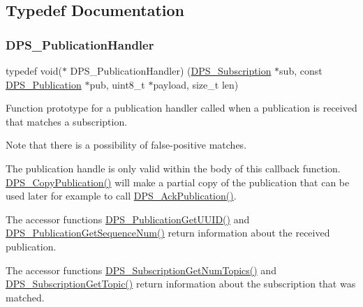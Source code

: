 \subsection{Typedef Documentation}
\mbox{\label{group__subscription_gab95ef1762636ad505c940744b8dce83f}} 
\subsubsection{\texorpdfstring{D\+P\+S\+\_\+\+Publication\+Handler}{DPS\_PublicationHandler}}
{\footnotesize\ttfamily typedef void($\ast$ D\+P\+S\+\_\+\+Publication\+Handler) (\hyperlink{group__subscription_gadb927c4c1b7306867a75fc4288b54af7}{D\+P\+S\+\_\+\+Subscription} $\ast$sub, const \hyperlink{group__publication_ga0d439693474aa54e27f3d45a054696ac}{D\+P\+S\+\_\+\+Publication} $\ast$pub, uint8\+\_\+t $\ast$payload, size\+\_\+t len)}



Function prototype for a publication handler called when a publication is received that matches a subscription. 

Note that there is a possibility of false-\/positive matches.

The publication handle is only valid within the body of this callback function. \hyperlink{group__publication_ga41f31a8b63558e13d73d96de6086e5c4}{D\+P\+S\+\_\+\+Copy\+Publication()} will make a partial copy of the publication that can be used later for example to call \hyperlink{group__publication_ga308074429a566ffb8d04d55bae520b04}{D\+P\+S\+\_\+\+Ack\+Publication()}.

The accessor functions \hyperlink{group__publication_gaba1ad3ee807b75a1281d334be06a12f7}{D\+P\+S\+\_\+\+Publication\+Get\+U\+U\+I\+D()} and \hyperlink{group__publication_ga875b48217d861d4a9fa5471419d354e9}{D\+P\+S\+\_\+\+Publication\+Get\+Sequence\+Num()} return information about the received publication.

The accessor functions \hyperlink{group__subscription_gab0ad2c6806f8f44f27c70fff915b7e9a}{D\+P\+S\+\_\+\+Subscription\+Get\+Num\+Topics()} and \hyperlink{group__subscription_gaacc63deda2f2d97cf3f44ca84784b2f6}{D\+P\+S\+\_\+\+Subscription\+Get\+Topic()} return information about the subscription that was matched.


